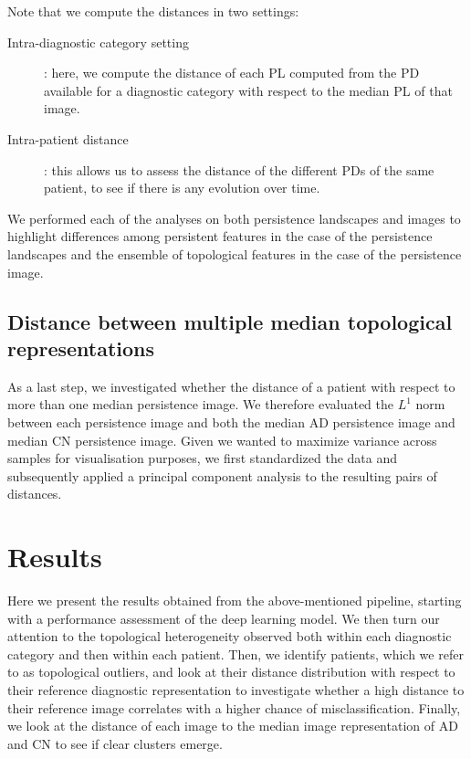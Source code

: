 \documentclass{article}
\begin{document}
Note that we compute the distances in two settings:
\begin{description}
\item[Intra-diagnostic category setting]: here, we compute the
distance of each PL computed from the PD available for a diagnostic category with respect to the median PL of that image.
\item[Intra-patient distance]: this allows us to assess the distance of the different PDs of the same patient, to see if there is any evolution over time.
\end{description}
We performed each of the analyses on both persistence landscapes and images to highlight differences among persistent features in the case of the persistence landscapes and the ensemble of topological features in the case of the persistence image.


\subsection{Distance between multiple median topological representations}\label{sec:methods_dist_multiple_images}

As a last step, we investigated whether the distance of a patient with respect to more than one median persistence image. We therefore evaluated the $L^1$ norm between each persistence image and both the median AD persistence image and median CN persistence image. Given we wanted to maximize variance across samples for visualisation purposes, we first standardized the data and subsequently applied a principal component analysis to the resulting pairs of distances.

\section{Results}\label{sec:results}

Here we present the results obtained from the above-mentioned pipeline, starting with a performance assessment of the deep learning model. We then turn our attention to the topological heterogeneity observed both within each diagnostic category and then within each patient. Then, we identify patients, which we refer to as topological outliers, and look at their distance distribution with respect to their reference diagnostic representation to investigate whether a high distance to their reference image correlates with a higher chance of misclassification. Finally, we look at the distance of each image to the median image representation of AD and CN to see if clear clusters emerge.
\end{document}
